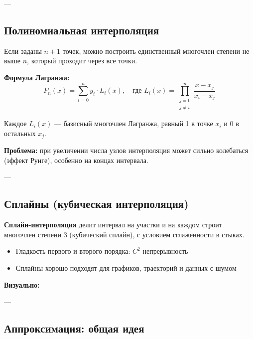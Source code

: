 ---

\subsection*{Полиномиальная интерполяция}

Если заданы $n+1$ точек, можно построить единственный многочлен степени не выше $n$, который проходит через все точки.

\textbf{Формула Лагранжа:}
\[
P_n(x) = \sum_{i=0}^{n} y_i \cdot L_i(x), \quad \text{где } L_i(x) = \prod_{\substack{j=0 \\ j \ne i}}^{n} \frac{x - x_j}{x_i - x_j}
\]

Каждое $L_i(x)$ — базисный многочлен Лагранжа, равный 1 в точке $x_i$ и 0 в остальных $x_j$.

\textbf{Проблема:} при увеличении числа узлов интерполяция может сильно колебаться (эффект Рунге), особенно на концах интервала.

---

\subsection*{Сплайны (кубическая интерполяция)}

\textbf{Сплайн-интерполяция} делит интервал на участки и на каждом строит многочлен степени 3 (кубический сплайн), с условием сглаженности в стыках.

\begin{itemize}
  \item Гладкость первого и второго порядка: $C^2$-непрерывность
  \item Сплайны хорошо подходят для графиков, траекторий и данных с шумом
\end{itemize}

\textbf{Визуально:}
\begin{center}
\end{center}

---

\subsection*{Аппроксимация: общая идея}

